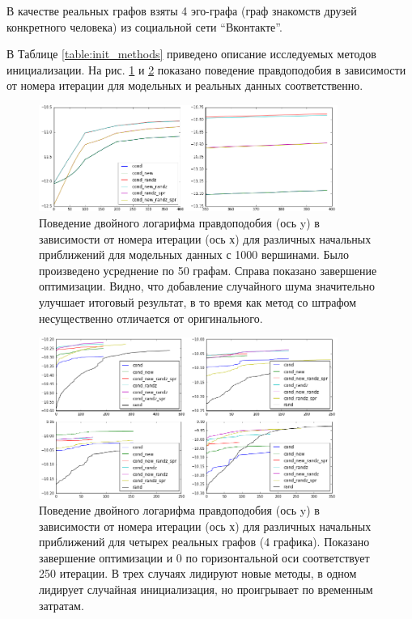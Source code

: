 \documentclass{ITaSconf}
\begin{document}
	В качестве реальных графов взяты 4 эго-графа (граф знакомств друзей конкретного человека) из социальной сети ``Вконтакте''.
	
	В Таблице \ref{table:init_methods} приведено описание исследуемых методов инициализации.
	На рис. \ref{fig:llh_init_model} и \ref{fig:llh_init_real} показано поведение правдоподобия в зависимости от номера итерации для модельных и реальных данных соответственно.
	
	\begin{figure}[!t]
		\centering
		\includegraphics[width=0.87\textwidth]{imgs/init_new_good.png}
		\caption{Поведение двойного логарифма правдоподобия (ось y) в зависимости от номера итерации (ось х) для различных начальных приближений для модельных данных \cite{lancichinetti2009benchmarks} с 1000 вершинами.
	Было произведено усреднение по 50 графам.
	Справа показано завершение оптимизации.
	Видно, что добавление случайного шума значительно улучшает итоговый результат, в то время как метод со штрафом несущественно отличается от оригинального.}
		\label{fig:llh_init_model}
	\end{figure}
	\begin{figure}[!h]
		\centering
		\includegraphics[width=0.87\textwidth]{imgs/init_llh_real.png}
		\caption{Поведение двойного логарифма правдоподобия (ось y) в зависимости от номера итерации (ось х) для различных начальных приближений для четырех реальных графов (4 графика).
	Показано завершение оптимизации и 0 по горизонтальной оси соответствует 250 итерации.
	В трех случаях лидируют новые методы, в одном лидирует случайная инициализация, но проигрывает по временным затратам.}
		\label{fig:llh_init_real}
	\end{figure}
\end{document}

